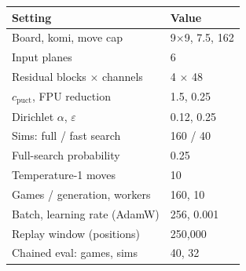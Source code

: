 \begin{tabular}{@{}ll@{}}
\toprule
Setting & Value \\
\midrule
Board, komi, move cap & 9$\times$9, 7.5, 162 \\
Input planes & 6 \\
Residual blocks $\times$ channels & 4 $\times$ 48 \\
$c_{\mathrm{puct}}$, FPU reduction & 1.5, 0.25 \\
Dirichlet $\alpha$, $\varepsilon$ & 0.12, 0.25 \\
Sims: full / fast search & 160 / 40 \\
Full-search probability & 0.25 \\
Temperature-1 moves & 10 \\
Games / generation, workers & 160, 10 \\
Batch, learning rate (AdamW) & 256, 0.001 \\
Replay window (positions) & 250,000 \\
Chained eval: games, sims & 40, 32 \\
\bottomrule
\end{tabular}
